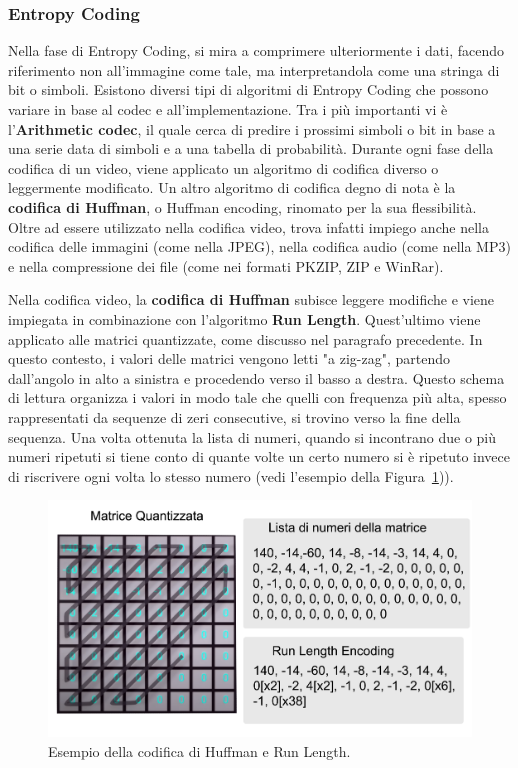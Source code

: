 \documentclass[a4paper,12pt, oneside]{article}
\begin{document}
\subsubsection{Entropy Coding}
Nella fase di Entropy Coding, si mira a comprimere ulteriormente i dati, facendo riferimento non
all'immagine come tale, ma interpretandola come una stringa di bit o simboli. Esistono diversi tipi di
algoritmi di Entropy Coding che possono variare in base al codec e all'implementazione.
Tra i più importanti vi è l'\textbf{Arithmetic codec}, il quale cerca di predire i prossimi
simboli o bit in base a una serie data di simboli e a una tabella di probabilità. Durante ogni fase
della codifica di un video, viene applicato un algoritmo di codifica diverso o leggermente
modificato. Un altro algoritmo di codifica degno di nota è la \textbf{codifica di Huffman}, o
Huffman encoding, rinomato per la sua flessibilità. Oltre ad essere utilizzato nella codifica video,
trova infatti impiego anche nella codifica delle immagini (come nella JPEG), nella codifica audio
(come nella MP3) e nella compressione dei file (come nei formati PKZIP, ZIP e WinRar).

Nella codifica video, la \textbf{codifica di Huffman} subisce leggere modifiche e viene impiegata
in combinazione con l'algoritmo \textbf{Run Length}. Quest'ultimo viene applicato alle matrici
quantizzate, come discusso nel paragrafo precedente. In questo contesto, i valori delle matrici vengono
letti "a zig-zag", partendo dall'angolo in alto a sinistra e procedendo verso il basso a destra.
Questo schema di lettura organizza i valori in modo tale che quelli con frequenza più alta, spesso 
rappresentati da sequenze di zeri consecutive, si trovino verso la fine della sequenza. Una volta ottenuta
la lista di numeri, quando si incontrano due o più numeri ripetuti si tiene conto di quante volte un certo
numero si è ripetuto invece di riscrivere ogni volta lo stesso numero (vedi l'esempio della
Figura~\ref{fig:huffman_example})).

\begin{figure}[h]
    \centering
    \includegraphics[width=1\textwidth]{images/huffman-example.png}
    \caption{Esempio della codifica di Huffman e Run Length.}
    \label{fig:huffman_example}
\end{figure}
\end{document}
